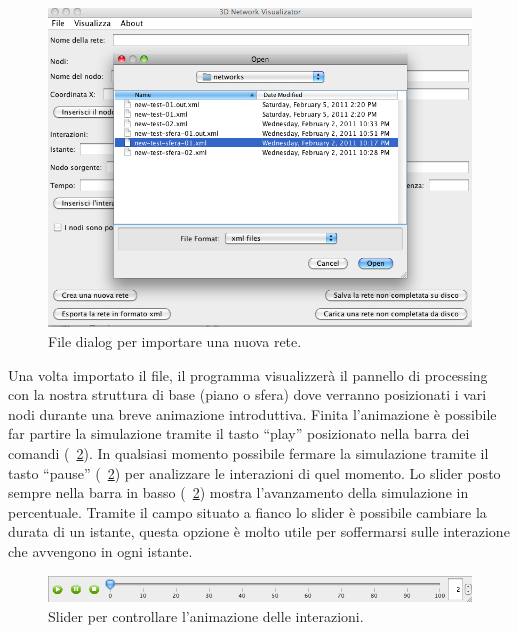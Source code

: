 \documentclass[a4paper,12pt]{article}
\begin{document}
\begin{figure}[htb!]
 \begin{center}
  \includegraphics[width=\textwidth]{images/image0.png}
 \end{center}
 \caption{File dialog per importare una nuova rete.}
 \label{fig:importnetwork}
\end{figure}
 
Una volta importato il file, il programma visualizzerà il pannello di processing con la nostra struttura di base (piano o sfera) dove verranno posizionati i vari nodi durante una breve animazione introduttiva. Finita l'animazione \`e possibile far partire la simulazione tramite il tasto “play” posizionato nella barra dei comandi (\figurename~\ref{fig:slider}). 
In qualsiasi momento possibile fermare la simulazione tramite il tasto “pause” (\figurename~\ref{fig:slider}) per analizzare le interazioni di quel momento.
Lo slider posto sempre nella barra in basso (\figurename~\ref{fig:slider}) mostra l'avanzamento della simulazione in percentuale. 
Tramite il campo situato a fianco lo slider \`e possibile cambiare la durata di un istante, questa opzione \`e molto utile per soffermarsi sulle interazione che avvengono in ogni  istante.
 
\begin{figure}[htb!]
 \begin{center}
  \includegraphics[width=\textwidth]{images/image1.png}
 \end{center}
 \caption{Slider per controllare l'animazione delle interazioni.}
 \label{fig:slider}
\end{figure}
 
\end{document}
